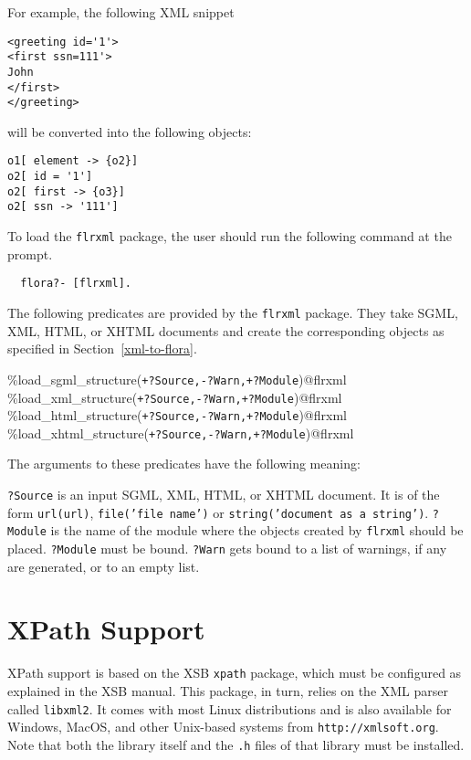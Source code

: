 For example, the following XML snippet

\begin{verbatim}
<greeting id='1'>
<first ssn=111'>
John
</first>
</greeting>
\end{verbatim}

will be converted into the following \FLORA objects:

\begin{verbatim}
o1[ element -> {o2}]
o2[ id = '1']
o2[ first -> {o3}]
o2[ ssn -> '111']
\end{verbatim}

To load the {\tt flrxml} package, the user should run the
following command at the \FLORA prompt.

\begin{verbatim}
  flora?- [flrxml]. 
\end{verbatim}

The following predicates are provided by the {\tt flrxml} package.  They
take SGML, XML, HTML, or XHTML documents and create the corresponding
\FLORA objects as specified in Section~\ref{xml-to-flora}.

\begin{description}
\item [\%load\_sgml\_structure({\tt +?Source,-?Warn,+?Module})@flrxml]
\item[\%load\_xml\_structure({\tt +?Source,-?Warn,+?Module})@flrxml]
\item[\%load\_html\_structure({\tt +?Source,-?Warn,+?Module})@flrxml]
\item[\%load\_xhtml\_structure({\tt +?Source,-?Warn,+?Module})@flrxml]
\end{description}
The arguments to these predicates have the following meaning:

{\tt ?Source} is an input SGML, XML, HTML, or XHTML document.
It is of the form {\tt url({\tt {url}})},
{\tt file('{\tt {file name}}')} or {\tt string('{\tt document as a string}')}. 
{\tt ?Module} is the name of the \FLORA module where the objects created
by {\tt flrxml}  should be placed. {\tt ?Module}  must be bound.
{\tt ?Warn} gets bound to a list of warnings, if any are generated, or to
an empty list.
  

\section{XPath Support}

XPath support is based on the XSB {\tt xpath} package, which must be
configured as explained in the XSB manual. This package, in turn, relies on
the XML parser called {\tt libxml2}. It comes with most Linux
distributions and is also available for Windows, MacOS, and other
Unix-based systems from {\tt http://xmlsoft.org}. 
Note that both the library itself and the {\tt .h} files of that
library must be installed. 

